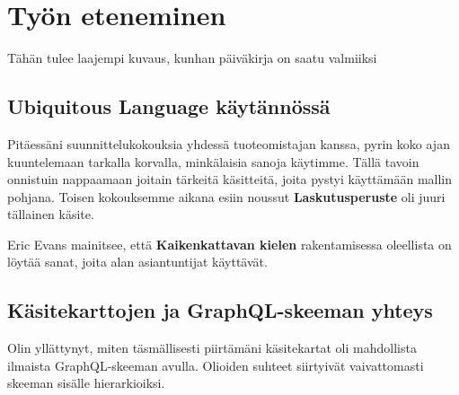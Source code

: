\vspace{21.5pt}

\hypertarget{tyuxf6n-eteneminen}{%
\chapter{Työn eteneminen}\label{tyuxf6n-eteneminen}}

Tähän tulee laajempi kuvaus, kunhan päiväkirja on saatu valmiiksi

\hypertarget{ubiquitous-language-kuxe4ytuxe4nnuxf6ssuxe4}{%
\section{Ubiquitous Language
käytännössä}\label{ubiquitous-language-kuxe4ytuxe4nnuxf6ssuxe4}}

Pitäessäni suunnittelukokouksia yhdessä tuoteomistajan kanssa, pyrin
koko ajan kuuntelemaan tarkalla korvalla, minkälaisia sanoja käytimme.
Tällä tavoin onnistuin nappaamaan joitain tärkeitä käsitteitä, joita
pystyi käyttämään mallin pohjana. Toisen kokouksemme aikana esiin
noussut \textbf{Laskutusperuste} oli juuri tällainen käsite.

Eric Evans mainitsee, että \textbf{Kaikenkattavan kielen} rakentamisessa
oleellista on löytää sanat, joita alan asiantuntijat käyttävät.

\hypertarget{kuxe4sitekarttojen-ja-graphql-skeeman-yhteys}{%
\section{Käsitekarttojen ja GraphQL-skeeman
yhteys}\label{kuxe4sitekarttojen-ja-graphql-skeeman-yhteys}}

Olin yllättynyt, miten täsmällisesti piirtämäni käsitekartat oli
mahdollista ilmaista GraphQL-skeeman avulla. Olioiden suhteet siirtyivät
vaivattomasti skeeman sisälle hierarkioiksi.
